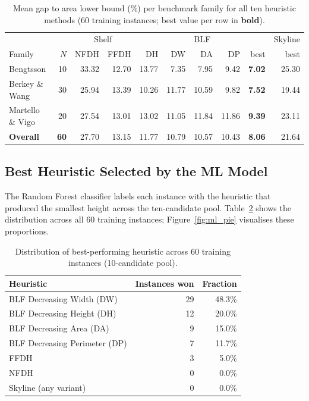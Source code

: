 \documentclass[11pt,a4paper]{article}
\begin{document}
\begin{table}[h]
\centering
\caption{Mean gap to area lower bound (\%) per benchmark family for all ten
         heuristic methods (60 training instances; best value per row in
         \textbf{bold}).}
\label{tab:family_summary}
\footnotesize
\setlength{\tabcolsep}{4pt}
\begin{tabular}{l r rr rrrrr r}
\toprule
& &
  \multicolumn{2}{c}{Shelf} &
  \multicolumn{5}{c}{BLF} &
  Skyline \\
\cmidrule(lr){3-4}\cmidrule(lr){5-9}
Family & $N$ & NFDH & FFDH & DH & DW & DA & DP & best & best \\
\midrule
Bengtsson        & 10 & 33.32 & 12.70 & 13.77 &  7.35 &  7.95 &  9.42 & \textbf{7.02} & 25.30 \\
Berkey \& Wang   & 30 & 25.94 & 13.39 & 10.26 & 11.77 & 10.59 &  9.82 & \textbf{7.52} & 19.44 \\
Martello \& Vigo & 20 & 27.54 & 13.01 & 13.02 & 11.05 & 11.84 & 11.86 & \textbf{9.39} & 23.11 \\
\midrule
\textbf{Overall} & \textbf{60} & 27.70 & 13.15 & 11.77 & 10.79 & 10.57 & 10.43 & \textbf{8.06} & 21.64 \\
\bottomrule
\end{tabular}
\end{table}

\subsection{Best Heuristic Selected by the ML Model}

The Random Forest classifier labels each instance with the heuristic that
produced the smallest height across the ten-candidate pool.
Table~\ref{tab:ml_dist} shows the distribution across all 60 training instances;
Figure~\ref{fig:ml_pie} visualises these proportions.

\begin{table}[h]
\centering
\caption{Distribution of best-performing heuristic across 60 training instances
         (10-candidate pool).}
\label{tab:ml_dist}
\begin{tabular}{lrr}
\toprule
Heuristic & Instances won & Fraction \\
\midrule
BLF Decreasing Width (DW)     & 29 & 48.3\% \\
BLF Decreasing Height (DH)    & 12 & 20.0\% \\
BLF Decreasing Area (DA)      &  9 & 15.0\% \\
BLF Decreasing Perimeter (DP) &  7 & 11.7\% \\
FFDH                           &  3 &  5.0\% \\
NFDH                           &  0 &  0.0\% \\
Skyline (any variant)          &  0 &  0.0\% \\
\bottomrule
\end{tabular}
\end{table}
\end{document}
